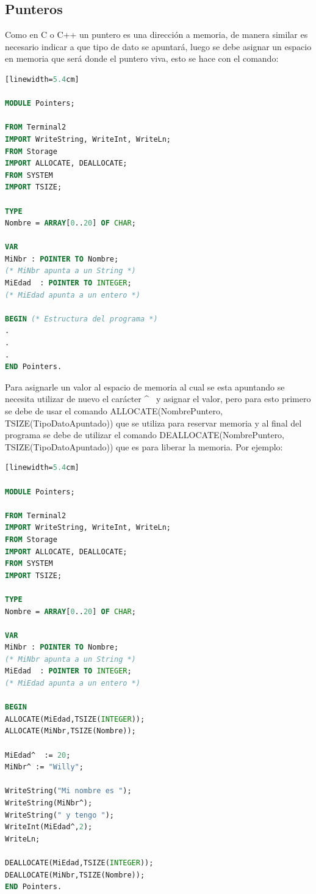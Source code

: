 \documentclass[10pt,journal,compsoc]{IEEEtran}
\begin{document}
\subsection{Punteros}
Como en C o C++ un puntero es una direcci\'on a memoria, de manera similar es necesario indicar a que tipo de dato se apuntar\'a, luego se debe asignar un espacio en memoria que ser\'a donde el puntero viva, esto se hace con el comando:
\begin{lstlisting}[language=Modula-2, caption = {C\'odigo de una lista con punteros}][linewidth=5.4cm]

MODULE Pointers;

FROM Terminal2   
IMPORT WriteString, WriteInt, WriteLn;
FROM Storage 
IMPORT ALLOCATE, DEALLOCATE;
FROM SYSTEM  
IMPORT TSIZE;

TYPE 
Nombre = ARRAY[0..20] OF CHAR;

VAR  
MiNbr : POINTER TO Nombre;    
(* MiNbr apunta a un String *)
MiEdad  : POINTER TO INTEGER; 
(* MiEdad apunta a un entero *)

BEGIN (* Estructura del programa *)
.
.
.
END Pointers.
\end{lstlisting}

Para asignarle un valor al espacio de memoria al cual se esta apuntando se necesita utilizar de nuevo el car\'acter \large \textasciicircum~ \normalsize y asignar el valor, pero para esto primero se debe de usar el comando ALLOCATE(NombrePuntero, TSIZE(TipoDatoApuntado)) que se utiliza para reservar memoria y al final del programa se debe de utilizar el comando DEALLOCATE(NombrePuntero, TSIZE(TipoDatoApuntado)) que es para liberar la memoria. Por ejemplo:
\begin{lstlisting}[language=Modula-2, caption = {C\'odigo de asignacion a un puntero.}][linewidth=5.4cm]

MODULE Pointers;

FROM Terminal2   
IMPORT WriteString, WriteInt, WriteLn;
FROM Storage 
IMPORT ALLOCATE, DEALLOCATE;
FROM SYSTEM  
IMPORT TSIZE;

TYPE 
Nombre = ARRAY[0..20] OF CHAR;

VAR  
MiNbr : POINTER TO Nombre;    
(* MiNbr apunta a un String *)
MiEdad  : POINTER TO INTEGER; 
(* MiEdad apunta a un entero *)

BEGIN
ALLOCATE(MiEdad,TSIZE(INTEGER));
ALLOCATE(MiNbr,TSIZE(Nombre));

MiEdad^  := 20;
MiNbr^ := "Willy";

WriteString("Mi nombre es ");
WriteString(MiNbr^);
WriteString(" y tengo ");
WriteInt(MiEdad^,2);
WriteLn;

DEALLOCATE(MiEdad,TSIZE(INTEGER));
DEALLOCATE(MiNbr,TSIZE(Nombre));
END Pointers.
\end{lstlisting}
\end{document}
